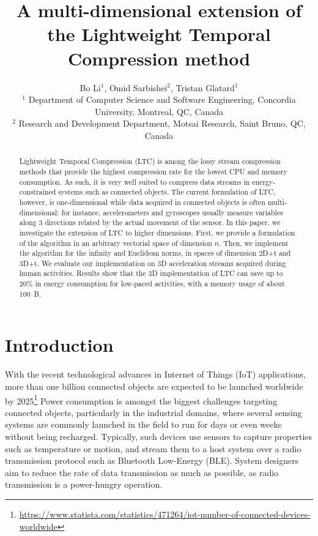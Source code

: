 \documentclass[10pt, conference, compsocconf]{IEEEtran}
\begin{document}
\title{A multi-dimensional extension of the Lightweight Temporal Compression method}

\author{Bo Li$^1$, Omid Sarbishei$^2$, Tristan Glatard$^1$\\
  $^1$ Department of Computer Science and Software Engineering, Concordia University, Montreal, QC, Canada \\
  $^2$  Research and Development Department, Motsai Research, Saint Bruno, QC, Canada}
\maketitle

\begin{abstract}
Lightweight Temporal Compression
(LTC) is among the lossy stream
compression methods that provide the highest compression rate for the 
lowest CPU and memory consumption. As such, it is very well suited to 
compress data streams in energy-constrained systems such as connected 
objects. The current formulation of LTC, however, is one-dimensional 
while data acquired in connected objects is often multi-dimensional: for instance, 
accelerometers and gyroscopes usually measure variables along 
3 directions related by the actual movement of the sensor. In this 
paper, we investigate the extension of LTC to 
higher dimensions. First, we provide a formulation 
of the algorithm in an arbitrary vectorial space of dimension $n$. 
Then, we implement the algorithm for the infinity and Euclidean norms, 
in spaces of dimension 2D+t and 3D+t. We evaluate our implementation on 
3D acceleration streams acquired during human activities. 
Results show that the 3D implementation of LTC can save up to 20\% in 
energy consumption for low-paced activities, with a memory usage of about 100~B.
\end{abstract}

\section{Introduction}

With the recent technological advances in Internet of Things (IoT) 
applications, more than one billion connected objects are expected to 
be launched worldwide by 2025\footnote{\url{ 
https://www.statista.com/statistics/471264/iot-number-of-connected-devices-worldwide}} 
Power consumption is amongst the biggest challenges targeting connected 
objects, particularly in the industrial domains, where several sensing 
systems are commonly launched in the field to run for days or even 
weeks without being recharged. Typically, such devices use sensors to 
capture properties such as temperature or motion, and stream them to a 
host system over a radio transmission protocol such as Bluetooth 
Low-Energy (BLE). System designers aim to reduce the rate of data 
transmission as much as possible, as radio transmission is a 
power-hungry operation.
\end{document}
